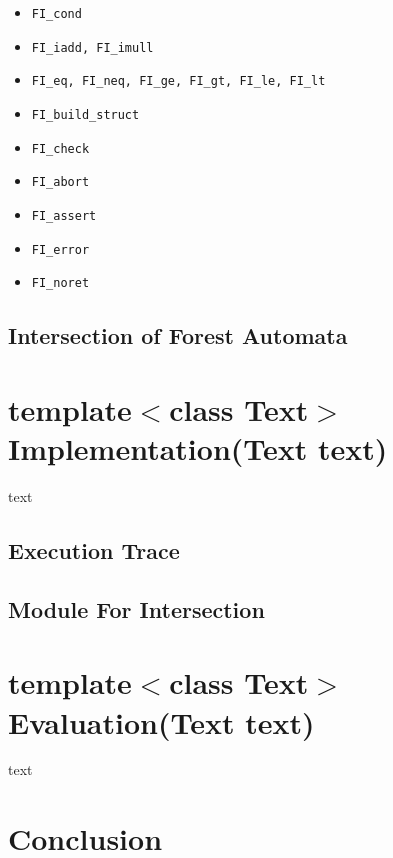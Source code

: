	\begin{itemize}

	\item {\tt FI\_cond}

	\item {\tt FI\_iadd, FI\_imull}

	\item {\tt FI\_eq, FI\_neq, FI\_ge, FI\_gt, FI\_le, FI\_lt}
	
	\item {\tt FI\_build\_struct}

	\item {\tt FI\_check}

	\item {\tt FI\_abort}
	
	\item {\tt FI\_assert}

	\item {\tt FI\_error}

	\item {\tt FI\_noret}

\end{itemize}


\section{Intersection of Forest Automata}

\chapter{template$<$class Text$>$ Implementation(Text text)}
\label{ch:impl}
text

\section{Execution Trace}
\section{Module For Intersection}

\chapter{template$<$class Text$>$ Evaluation(Text text)}
\label{ch:eval}
text

\chapter{Conclusion}
\label{ch:concl}

